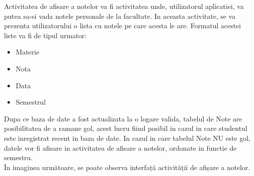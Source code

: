 \documentclass{article}
\begin{document}
		Activitatea de afisare a notelor va fi activitatea unde, utilizatorul aplicatiei, va putea sa-si vada notele personale de la facultate. In aceasta activitate, se va prezenta utilizatorului o lista cu notele pe care acesta le are. Formatul acestei liste va fi de tipul urmator:
	\begin{itemize}
		\item Materie
		\item Nota
		\item Data
		\item Semestrul
	\end{itemize}
	
		Dupa ce baza de date a fost actualizata la o logare valida, tabelul de Note are posibilitatea de a ramane gol, acest lucru fiind posibil in cazul in care studentul este inregistrat recent in baza de date. In cazul in care tabelul Note NU este gol, datele vor fi afisare in activitatea de afisare a notelor, ordonate in functie de semestru. \\

		În imaginea următoare, se poate observa interfață activității de afișare a notelor. 
\end{document}
